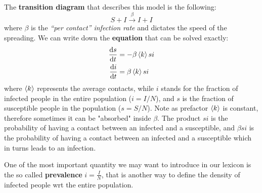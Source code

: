 \documentclass[../main/main.tex]{subfiles}
\begin{document}
The \textbf{transition diagram} that describes this model is the following:
\begin{equation}
  S + I \overset{\beta }{\rightarrow} I + I
\end{equation}
where $\beta$ is the \textit{“per contact” infection rate} and dictates the speed of the spreading. We can write down the \textbf{equation} that can be solved exactly:
\begin{equation}
\begin{split}
  \dv{s}{t} &= - \beta \expval{k} s i \\ \dv{i}{t} &= \beta \expval{k} s i
\end{split}
\end{equation}
where $\expval{k}$ represents the average contacts, while $i$ stands for the fraction of infected people in the entire population ($i=I/N$), and $s$ is the fraction of susceptible people in the population ($s=S/N$). Note as prefactor $\expval{k}$ is constant, therefore sometimes it can be "absorbed" inside $\beta$. 
The product $s i$ is the probability of having a contact between an infected and a susceptible, and $\beta  s i$ is the probability of having a contact between an infected and a susceptible which in turns leads to an infection.

One of the most important quantity we may want to introduce in our lexicon is the so called \textbf{prevalence} $i = \frac{I}{N}$, that is another way to define the density of infected people wrt the entire population.
\end{document}

